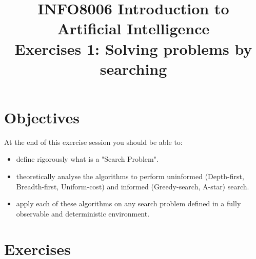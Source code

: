 \documentclass[9pt,a4paper]{extarticle}
\title{{\bf INFO8006 Introduction to Artificial Intelligence}\\[1em]
Exercises 1: Solving problems by searching}
\begin{document}
\maketitle
\vspace{-4em}

  \section*{Objectives}
  At the end of this exercise session you should be able to:
\begin{itemize}
   \item define rigorously what is a "Search Problem".
   \item theoretically analyse the algorithms to perform uninformed (Depth-first, Breadth-first, Uniform-cost) and informed (Greedy-search, A-star) search.
   \item apply each of these algorithms on any search problem defined in a fully observable and deterministic environment.
\end{itemize}

   \section*{Exercises}
\end{document}
